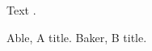 \documentclass{article}
\begin{document}
Text \cite{a}.
\begin{enumerate}
 Able, A title.
 Baker, B title.
\end{enumerate}
\end{document}
